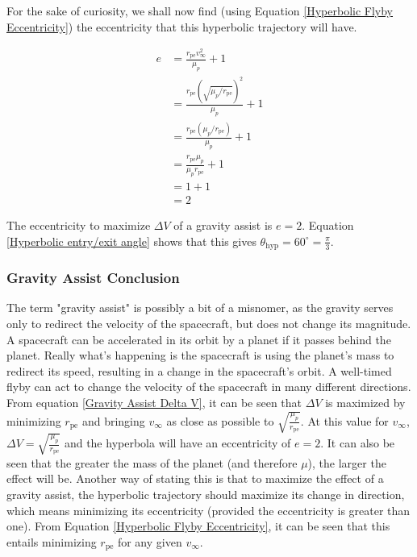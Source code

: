 \documentclass{article}
\begin{document}
For the sake of curiosity, we shall now find (using Equation \eqref{Hyperbolic Flyby Eccentricity}) the eccentricity that this hyperbolic trajectory will have.

\begin{align*}
    e & = \frac{r_\text{pe}v_\infty^2}{\mu_p}+1                   \\
      & = \frac{r_\text{pe}(\sqrt{\mu_p/r_\text{pe}})^2}{\mu_p}+1 \\
      & = \frac{r_\text{pe}(\mu_p/r_\text{pe})}{\mu_p}+1          \\
      & = \frac{r_\text{pe}\mu_p}{\mu_p r_\text{pe}}+1            \\
      & = 1+1                                                     \\
      & = 2
\end{align*}

The eccentricity to maximize $\Delta V$ of a gravity assist is $e=2$. Equation \eqref{Hyperbolic entry/exit angle} shows that this gives $\theta_\text{hyp}=60^{\circ}=\frac{\pi}{3}$.

\subsubsection{Gravity Assist Conclusion}

The term "gravity assist" is possibly a bit of a misnomer, as the gravity serves only to redirect the velocity of the spacecraft, but does not change its magnitude. A spacecraft can be accelerated in its orbit by a planet if it passes behind the planet. Really what's happening is the spacecraft is using the planet's mass to redirect its speed, resulting in a change in the spacecraft's orbit. A well-timed flyby can act to change the velocity of the spacecraft in many different directions. From equation \eqref{Gravity Assist Delta V}, it can be seen that $\Delta V$ is maximized by minimizing $r_\text{pe}$ and bringing $v_\infty$ as close as possible to $\sqrt{\frac{\mu_p}{r_\text{pe}}}$. At this value for $v_\infty$, $\Delta V = \sqrt{\frac{\mu_p}{r_\text{pe}}}$ and the hyperbola will have an eccentricity of $e=2$. It can also be seen that the greater the mass of the planet (and therefore $\mu$), the larger the effect will be. Another way of stating this is that to maximize the effect of a gravity assist, the hyperbolic trajectory should maximize its change in direction, which means minimizing its eccentricity (provided the eccentricity is greater than one). From Equation \eqref{Hyperbolic Flyby Eccentricity}, it can be seen that this entails minimizing $r_\text{pe}$ for any given $v_\infty$.
\end{document}
